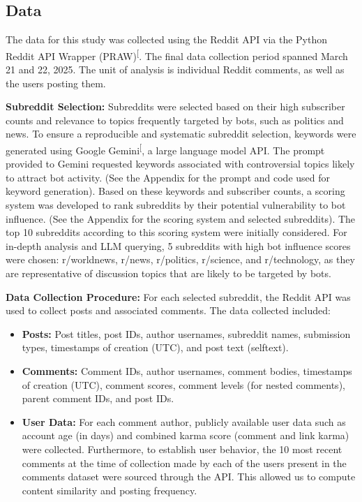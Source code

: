 \documentclass[
  12pt,
  letterpaper,
  DIV=11,
  numbers=noendperiod,
  abstract]{scrartcl}
\providecommand{\tightlist}{%
  \setlength{\itemsep}{0pt}\setlength{\parskip}{0pt}}\usepackage{longtable,booktabs,array}
\begin{document}
\subsection{Data}\label{data}

The data for this study was collected using the Reddit API via the
Python Reddit API Wrapper
(PRAW)\textsuperscript{{[}\citeproc{ref-praw2024}{18}{]}}. The final
data collection period spanned March 21 and 22, 2025. The unit of
analysis is individual Reddit comments, as well as the users posting
them.

\textbf{Subreddit Selection:} Subreddits were selected based on their
high subscriber counts and relevance to topics frequently targeted by
bots, such as politics and news. To ensure a reproducible and systematic
subreddit selection, keywords were generated using Google
Gemini\textsuperscript{{[}\citeproc{ref-googleai2023gemini}{19}{]}}, a
large language model API. The prompt provided to Gemini requested
keywords associated with controversial topics likely to attract bot
activity. (See the Appendix for the prompt and code used for keyword
generation). Based on these keywords and subscriber counts, a scoring
system was developed to rank subreddits by their potential vulnerability
to bot influence. (See the Appendix for the scoring system and selected
subreddits). The top 10 subreddits according to this scoring system were
initially considered. For in-depth analysis and LLM querying, 5
subreddits with high bot influence scores were chosen: r/worldnews,
r/news, r/politics, r/science, and r/technology, as they are
representative of discussion topics that are likely to be targeted by
bots.

\textbf{Data Collection Procedure:} For each selected subreddit, the
Reddit API was used to collect posts and associated comments. The data
collected included:

\begin{itemize}
\tightlist
\item
  \textbf{Posts:} Post titles, post IDs, author usernames, subreddit
  names, submission types, timestamps of creation (UTC), and post text
  (selftext).
\item
  \textbf{Comments:} Comment IDs, author usernames, comment bodies,
  timestamps of creation (UTC), comment scores, comment levels (for
  nested comments), parent comment IDs, and post IDs.
\item
  \textbf{User Data:} For each comment author, publicly available user
  data such as account age (in days) and combined karma score (comment
  and link karma) were collected. Furthermore, to establish user
  behavior, the 10 most recent comments at the time of collection made
  by each of the users present in the comments dataset were sourced
  through the API. This allowed us to compute content similarity and
  posting frequency.
\end{itemize}
\end{document}
